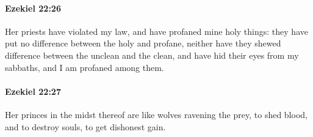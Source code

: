		\paragraph{Ezekiel 22:26} %
			\label{EZEKIEL-22-26}

			Her priests have violated my law, and have profaned mine holy things: they have put no difference between the holy and profane, neither have they shewed difference between the unclean and the clean, and have hid their eyes from my sabbaths, and I am profaned among them.


		\paragraph{Ezekiel 22:27} %
			\label{EZEKIEL-22-27}

			Her princes in the midst thereof are like wolves ravening the prey, to shed blood, and to destroy souls, to get dishonest gain.

